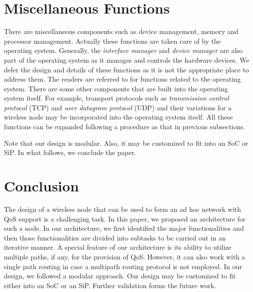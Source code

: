 \documentclass[10pt,times,epsfig,psfig,twocolumn,algorithm,algorithmic]{IEEEtran}
\begin{document}
\section{Miscellaneous Functions}
There are miscellaneous components such as device management, memory and processor management. Actually these functions are taken care of by the operating system. Generally, the {\em interface manager} and {\em device manager} are also part of the operating system as it manages and controls the hardware devices. We defer the design and details of these functions as it is not the appropriate place to address them. The readers are referred to \cite{silberschatz} for functions related to the operating system. There are some other components that are built into the operating system itself. For example, transport protocols such as {\em transmission control protocol} (TCP) and {\em user datagram protocol} (UDP) and their variations for a wireless node may be incorporated into the operating system itself.  All these functions can be expanded following a procedure as that in previous subsections.   

Note that our design is modular. Also, it may be customized to fit into an SoC or SiP. In what follows, we conclude the paper.



\section{Conclusion}
The design of a wireless node that can be used to form an ad hoc network with QoS support is a challenging task. In this paper, we proposed an architecture for such a node. In our architecture, we first identified the major functionalities and then those functionalities are divided into subtasks to be carried out in an iterative manner. A special feature of our architecture is its ability to utilize multiple paths, if any, for the provision of QoS. However, it can also work with a single path routing in case a multipath routing protocol is not employed.  In our design, we followed a modular approach. Our design may be customized to fit either into an SoC or an SiP. Further validation forms the future work.   
\end{document}
